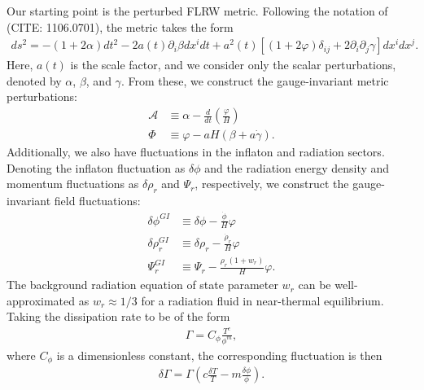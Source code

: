 Our starting point is the perturbed FLRW metric. Following the notation of (CITE: 1106.0701), the metric takes the form
\begin{align}
    ds^2 = -(1+2\alpha)dt^2 - 2 a(t) \partial_i\beta dx^i dt + a^2(t)\left[ (1+2\varphi)\delta_{ij} + 2\partial_i\partial_j \gamma \right]dx^i dx^j.
\end{align}
Here, $a(t)$ is the scale factor, and we consider only the scalar perturbations, denoted by $\alpha$, $\beta$, and $\gamma$. From these, we construct the gauge-invariant metric perturbations:
\begin{align}
    \mathcal{A} &\equiv \alpha - \frac{d}{dt}\left(\frac{\varphi}{H}\right)\\
    \Phi &\equiv \varphi - aH(\beta + a\dot\gamma).
\end{align}
Additionally, we also have fluctuations in the inflaton and radiation sectors. Denoting the inflaton fluctuation as $\delta\phi$ and the radiation energy density and momentum fluctuations as $\delta\rho_r$ and $\Psi_r$, respectively, we construct the gauge-invariant field fluctuations:
\begin{align}
    \delta\phi^{GI} &\equiv \delta\phi - \frac{\dot\phi}{H}\varphi\\
    \delta\rho_r^{GI} &\equiv \delta\rho_r - \frac{\dot\rho_r}{H}\varphi\\
    \Psi_r^{GI} &\equiv \Psi_r - \frac{\rho_r(1+w_r)}{H}\varphi.
\end{align}
The background radiation equation of state parameter $w_r$ can be well-approximated as $w_r \approx 1/3$ for a radiation fluid in near-thermal equilibrium. Taking the dissipation rate to be of the form
\begin{align}
    \Gamma = C_\phi \frac{T^c}{\phi^m},
\end{align}
where $C_\phi$ is a dimensionless constant, the corresponding fluctuation is then
\begin{align}
    \delta\Gamma = \Gamma \left( c\frac{\delta T}{T} - m\frac{\delta\phi}{\phi} \right).
\end{align}

